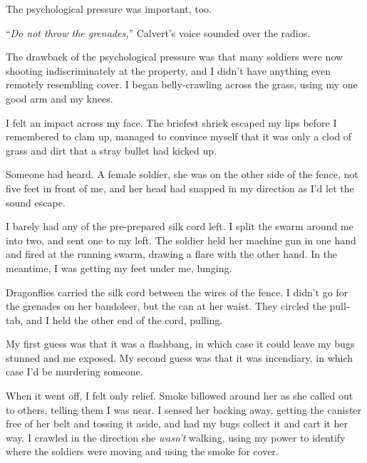 The psychological pressure was important, too.



``\emph{Do not throw the grenades,}'' Calvert's voice sounded over the radios.



The drawback of the psychological pressure was that many soldiers were now shooting indiscriminately at the property, and I didn't have anything even remotely resembling cover.  I began belly-crawling across the grass, using my one good arm and my knees.



I felt an impact across my face.  The briefest shriek escaped my lips before I remembered to clam up, managed to convince myself that it was only a clod of grass and dirt that a stray bullet had kicked up.



Someone had heard.  A female soldier, she was on the other side of the fence, not five feet in front of me, and her head had snapped in my direction as I'd let the sound escape.



I barely had any of the pre-prepared silk cord left.  I split the swarm around me into two, and sent one to my left.  The soldier held her machine gun in one hand and fired at the running swarm, drawing a flare with the other hand.  In the meantime, I was getting my feet under me, lunging.



Dragonflies carried the silk cord between the wires of the fence.  I didn't go for the grenades on her bandoleer, but the can at her waist.  They circled the pull-tab, and I held the other end of the cord, pulling.



My first guess was that it was a flashbang, in which case it could leave my bugs stunned and me exposed.  My second guess was that it was incendiary, in which case I'd be murdering someone.



When it went off, I felt only relief.  Smoke billowed around her as she called out to others, telling them I was near.  I sensed her backing away, getting the canister free of her belt and tossing it aside, and had my bugs collect it and cart it her way.  I crawled in the direction she \emph{wasn't} walking, using my power to identify where the soldiers were moving and using the smoke for cover.



